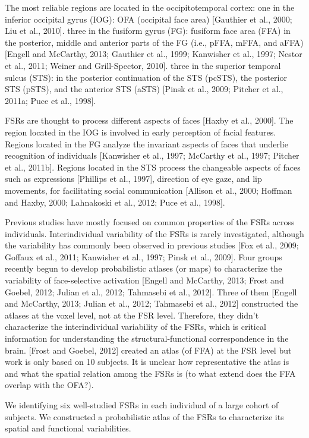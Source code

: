 The most reliable regions are located in the occipitotemporal cortex:
%
one in the inferior occipital gyrus (IOG): OFA (occipital face area) [Gauthier
et al., 2000; Liu et al., 2010].
%
three in the fusiform gyrus (FG): fusiform face area (FFA) in the posterior,
middle and anterior parts of the FG (i.e., pFFA, mFFA, and aFFA) [Engell and
McCarthy, 2013; Gauthier et al., 1999; Kanwisher et al., 1997; Nestor et al.,
2011; Weiner and Grill-Spector, 2010].
%
three in the superior temporal sulcus (STS): in the posterior continuation of
the STS (pcSTS), the posterior STS (pSTS), and the anterior STS (aSTS) [Pinsk et
al., 2009; Pitcher et al., 2011a; Puce et al., 1998].

%
FSRs are thought to process different aspects of faces [Haxby et al., 2000].
%
The region located in the IOG is involved in early perception of facial
features.
%
Regions located in the FG analyze the invariant aspects of faces that underlie
recognition of individuals [Kanwisher et al., 1997; McCarthy et al., 1997;
Pitcher et al., 2011b].
%
Regions located in the STS process the changeable aspects of faces such as
expressions [Phillips et al., 1997], direction of eye gaze, and lip movements,
for facilitating social communication [Allison et al., 2000; Hoffman and Haxby,
2000; Lahnakoski et al., 2012; Puce et al., 1998].

%
Previous studies have mostly focused on common properties of the FSRs across
individuals.
%
Interindividual variability of the FSRs is rarely investigated, although the
variability has commonly been observed in previous studies [Fox et al., 2009;
Goffaux et al., 2011; Kanwisher et al., 1997; Pinsk et al., 2009].
%
Four groups recently begun to develop probabilistic atlases (or maps) to
characterize the variability of face-selective activation [Engell and McCarthy,
2013; Frost and Goebel, 2012; Julian et al., 2012; Tahmasebi et al., 2012].
%
Three of them [Engell and McCarthy, 2013; Julian et al., 2012; Tahmasebi et al.,
2012] constructed the atlases at the voxel level, not at the FSR level.
%
Therefore, they didn't characterize the interindividual variability of the FSRs,
which is critical information for understanding the structural-functional
correspondence in the brain.
%
[Frost and Goebel, 2012] created an atlas (of FFA) at the FSR level but work is
only based on 10 subjects.
%
It is unclear how representative the atlas is and what the spatial relation
among the FSRs is (to what extend does the FFA overlap with the OFA?).

%
We identifying six well-studied FSRs in each individual of a large cohort of
subjects.
%
We constructed a probabilistic atlas of the FSRs to characterize its spatial and
functional variabilities.

